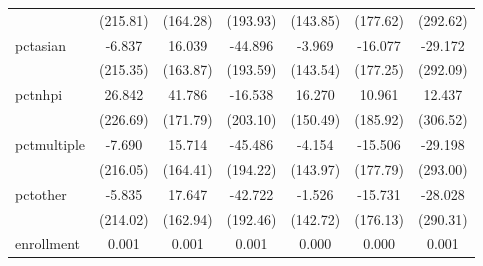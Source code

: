 {\begin{tabular}{l*{6}{c}}
            &                 (215.81)         &                 (164.28)         &                 (193.93)         &                 (143.85)         &                 (177.62)         &                 (292.62)         \\
pctasian    &                   -6.837         &                   16.039         &                  -44.896         &                   -3.969         &                  -16.077         &                  -29.172         \\
            &                 (215.35)         &                 (163.87)         &                 (193.59)         &                 (143.54)         &                 (177.25)         &                 (292.09)         \\
pctnhpi     &                   26.842         &                   41.786         &                  -16.538         &                   16.270         &                   10.961         &                   12.437         \\
            &                 (226.69)         &                 (171.79)         &                 (203.10)         &                 (150.49)         &                 (185.92)         &                 (306.52)         \\
pctmultiple &                   -7.690         &                   15.714         &                  -45.486         &                   -4.154         &                  -15.506         &                  -29.198         \\
            &                 (216.05)         &                 (164.41)         &                 (194.22)         &                 (143.97)         &                 (177.79)         &                 (293.00)         \\
pctother    &                   -5.835         &                   17.647         &                  -42.722         &                   -1.526         &                  -15.731         &                  -28.028         \\
            &                 (214.02)         &                 (162.94)         &                 (192.46)         &                 (142.72)         &                 (176.13)         &                 (290.31)         \\
enrollment  &                    0.001         &                    0.001         &                    0.001         &                    0.000         &                    0.000         &                    0.001         \\

\end{tabular}}
